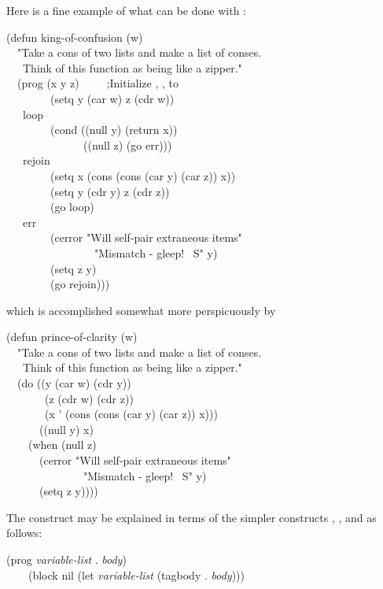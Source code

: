 \begin{defmac}
Here is a fine example of what can be done with :
\begin{lisp}
(defun king-of-confusion (w) \\
~~"Take a cons of two lists and make a list of conses. \\
~~~Think of this function as being like a zipper." \\
~~(prog (x y z)~~~~~;{\rm Initialize , ,  to {\false}} \\
~~~~~~~~(setq y (car w) z (cdr w)) \\
~~~loop \\
~~~~~~~~(cond ((null y) (return x)) \\
~~~~~~~~~~~~~~((null z) (go err))) \\
~~~rejoin \\
~~~~~~~~(setq x (cons (cons (car y) (car z)) x)) \\
~~~~~~~~(setq y (cdr y) z (cdr z)) \\
~~~~~~~~(go loop) \\
~~~err \\
~~~~~~~~(cerror "Will self-pair extraneous items" \\
~~~~~~~~~~~~~~~~"Mismatch - gleep!  ~S" y) \\
~~~~~~~~(setq z y) \\
~~~~~~~~(go rejoin)))
\end{lisp}
which is accomplished somewhat more perspicuously by
\begin{lisp}
(defun prince-of-clarity (w) \\
~~"Take a cons of two lists and make a list of conses. \\
~~~Think of this function as being like a zipper." \\
~~(do ((y (car w) (cdr y)) \\
~~~~~~~(z (cdr w) (cdr z)) \\
~~~~~~~(x '{\emptylist} (cons (cons (car y) (car z)) x))) \\
~~~~~~((null y) x) \\
~~~~(when (null z) \\
~~~~~~(cerror "Will self-pair extraneous items" \\
~~~~~~~~~~~~~~"Mismatch - gleep!  ~S" y) \\
~~~~~~(setq z y))))
\end{lisp}

The  construct may be explained in terms of the simpler
constructs , , and  as
follows:
\begin{lisp}
(prog {\it variable-list}  . {\it body}) \\
~~~\EQ\ (block nil (let {\it variable-list}  (tagbody . {\it body})))
\end{lisp}


\end{defmac}
